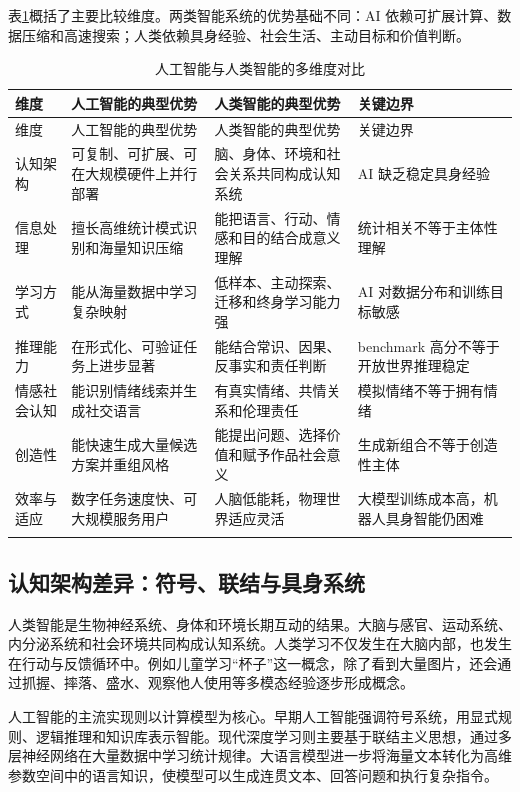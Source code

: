 \documentclass[UTF8,zihao=5,a4paper]{ctexart}
\begin{document}
表\ref{tab:ai_human_compare}概括了主要比较维度。两类智能系统的优势基础不同：AI 依赖可扩展计算、数据压缩和高速搜索；人类依赖具身经验、社会生活、主动目标和价值判断。

\begin{longtable}{p{2.6cm}p{4.0cm}p{4.0cm}p{3.2cm}}
\toprule
维度 & 人工智能的典型优势 & 人类智能的典型优势 & 关键边界 \\
\midrule
\endfirsthead
\toprule
维度 & 人工智能的典型优势 & 人类智能的典型优势 & 关键边界 \\
\midrule
\endhead
认知架构 & 可复制、可扩展、可在大规模硬件上并行部署 & 脑、身体、环境和社会关系共同构成认知系统 & AI 缺乏稳定具身经验 \\
信息处理 & 擅长高维统计模式识别和海量知识压缩 & 能把语言、行动、情感和目的结合成意义理解 & 统计相关不等于主体性理解 \\
学习方式 & 能从海量数据中学习复杂映射 & 低样本、主动探索、迁移和终身学习能力强 & AI 对数据分布和训练目标敏感 \\
推理能力 & 在形式化、可验证任务上进步显著 & 能结合常识、因果、反事实和责任判断 & benchmark 高分不等于开放世界推理稳定 \\
情感社会认知 & 能识别情绪线索并生成社交语言 & 有真实情绪、共情关系和伦理责任 & 模拟情绪不等于拥有情绪 \\
创造性 & 能快速生成大量候选方案并重组风格 & 能提出问题、选择价值和赋予作品社会意义 & 生成新组合不等于创造性主体 \\
效率与适应 & 数字任务速度快、可大规模服务用户 & 人脑低能耗，物理世界适应灵活 & 大模型训练成本高，机器人具身智能仍困难 \\
\bottomrule
\caption{人工智能与人类智能的多维度对比}
\label{tab:ai_human_compare}\\
\end{longtable}

\subsection{认知架构差异：符号、联结与具身系统}

人类智能是生物神经系统、身体和环境长期互动的结果。大脑与感官、运动系统、内分泌系统和社会环境共同构成认知系统。人类学习不仅发生在大脑内部，也发生在行动与反馈循环中。例如儿童学习“杯子”这一概念，除了看到大量图片，还会通过抓握、摔落、盛水、观察他人使用等多模态经验逐步形成概念。

人工智能的主流实现则以计算模型为核心。早期人工智能强调符号系统，用显式规则、逻辑推理和知识库表示智能。现代深度学习则主要基于联结主义思想，通过多层神经网络在大量数据中学习统计规律。大语言模型进一步将海量文本转化为高维参数空间中的语言知识，使模型可以生成连贯文本、回答问题和执行复杂指令。
\end{document}
